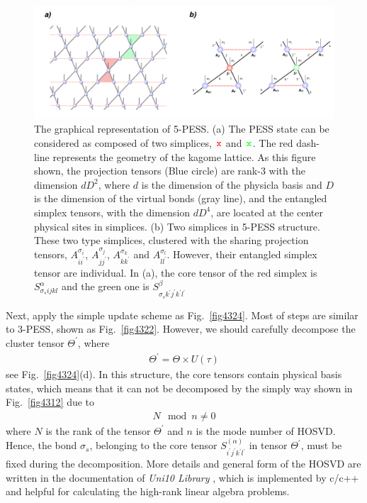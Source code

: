 \begin{figure}[ht]
	\centering
	\includegraphics[width=1.00\textwidth]{figures/fig4323.png}
	\caption[The graphical representation of 5-PESS]{The graphical representation of 5-PESS. (a) The PESS state can be considered as composed of two simplices, $\rjoinr$ and $\rjoing$. The red dash-line represents the geometry of the kagome lattice. As this figure shown, the projection tensors (Blue circle) are rank-3 with the dimension $dD^2$, where $d$ is the dimension of the physicla basis and $D$ is the dimension of the virtual bonds (gray line), and the entangled simplex tensors, with the dimension $dD^4$, are located at the center physical sites in simplices. (b) Two simplices in 5-PESS structure. These two type simplices, clustered with the sharing projection tensors, $A^{\sigma_i}_{ii^{\prime}}$, $A^{\sigma_j}_{jj^{\prime}}$, $A^{\sigma_k}_{kk^{\prime}}$ and $A^{\sigma_l}_{ll^{\prime}}$. However, their entangled simplex tensor are individual. In (a), the core tensor of the red simplex is $S^{\alpha}_{\sigma_s ijkl}$ and the green one is $S^{\beta}_{\sigma_s k^{\prime}j^{\prime}k^{\prime}l^{\prime}}$}
	\label{fig4323}
\end{figure}
Next, apply the simple update scheme as Fig.~\ref{fig4324}. Most of steps are similar to 3-PESS, shown as Fig.~\ref{fig4322}. However, we should carefully decompose the cluster tensor $\Theta^{\prime}$, where
\begin{align}
	\Theta^{\prime} = \Theta \times U(\tau)
\end{align}
see Fig.~\ref{fig4324}(d). In this structure, the core tensors contain physical basis states, which means that it can not be decomposed by the simply way shown in Fig.~\ref{fig4312} due to
\begin{align}
	N \mod n \neq 0
\end{align}
where $N$ is the rank of the tensor $\Theta^{\prime}$ and $n$ is the mode number of HOSVD. Hence, the bond $\sigma_s$, belonging to the core tensor $S^{(\alpha)}_{i^{\prime}j^{\prime}k^{\prime}l^{\prime}}$ in tensor $\Theta^{\prime}$, must be fixed during the decomposition. More details and general form of the HOSVD are written in the documentation of \textit{Uni10 Library} \cite{1742-6596-640-1-012040}, which is implemented by c/c++ and helpful for calculating the high-rank linear algebra problems.
